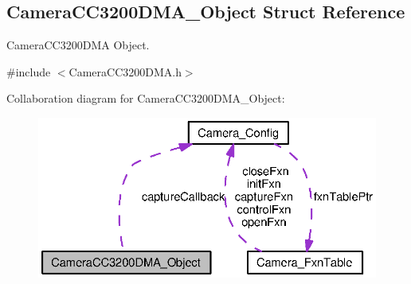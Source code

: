 \subsection{Camera\+C\+C3200\+D\+M\+A\+\_\+\+Object Struct Reference}
\label{struct_camera_c_c3200_d_m_a___object}


Camera\+C\+C3200\+D\+M\+A Object.  




{\ttfamily \#include $<$Camera\+C\+C3200\+D\+M\+A.\+h$>$}



Collaboration diagram for Camera\+C\+C3200\+D\+M\+A\+\_\+\+Object\+:
\nopagebreak
\begin{figure}[H]
\begin{center}
\leavevmode
\includegraphics[width=332pt]{struct_camera_c_c3200_d_m_a___object__coll__graph}
\end{center}
\end{figure}
